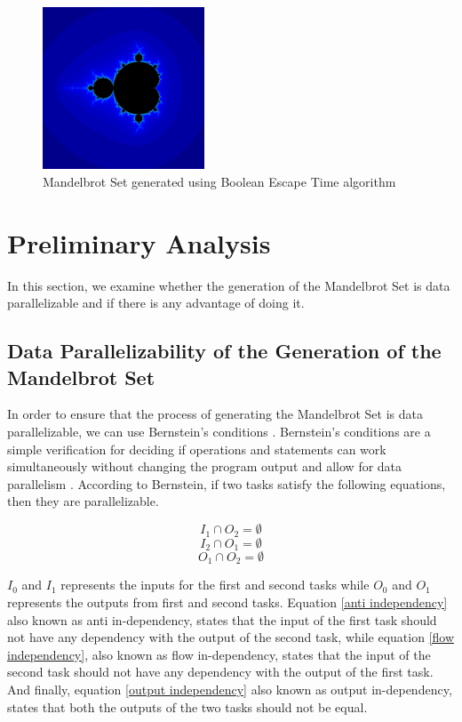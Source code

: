 \documentclass[conference]{IEEEtran}
\begin{document}
	\begin{figure}[h]
	\centering
	\includegraphics[width=1.9in]{mandel}
	\caption{Mandelbrot Set generated using Boolean Escape Time algorithm\cite{rosettacode}}
	\label{Mandel}
\end{figure}


	\section{Preliminary Analysis}
	In this section, we examine whether the generation of the Mandelbrot Set is data parallelizable and if there is any advantage of doing it.
			\subsection{Data Parallelizability of the Generation of the Mandelbrot Set}
			
			In order to ensure that the process of generating the Mandelbrot Set is data parallelizable, we can use Bernstein’s conditions \cite{bernstein1996analysis}. Bernstein's conditions are a simple verification for deciding if operations and statements can work simultaneously without changing the program output and allow for data parallelism \cite{Feautrier2011}. According to Bernstein, if two tasks satisfy the following equations, then they are parallelizable.
			
			\begin{equation}
				I_1 \cap O_2 = \emptyset\label{anti independency}
			\end{equation}
			\begin{equation}
				I_2 \cap O_1 = \emptyset \label{flow independency}
			\end{equation}
			\begin{equation}
				O_1 \cap O_2 = \emptyset \label{output independency}
			\end{equation}
			
			$I_0$ and $I_1$ represents the inputs for the first and second tasks while  $O_0$ and $O_1$ represents the outputs from first and second tasks. Equation \ref{anti independency} also known as anti in-dependency, states that the input of the first task should not have any dependency with the output of the second task, while equation \ref{flow independency}, also known as flow in-dependency, states that the input of the second task should not have any dependency with the output of the first task. And finally, equation \ref{output independency} also known as output in-dependency, states that both the outputs of the two tasks should not be equal.
			
\end{document}

